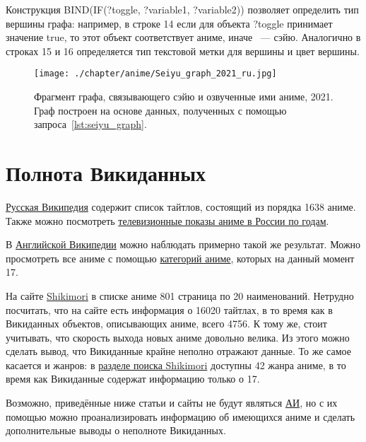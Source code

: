 Конструкция BIND(IF(?toggle, ?variable1, ?variable2)) позволяет определить тип вершины графа: например, в строке 14 если для объекта ?toggle принимает значение true, то этот объект соответствует аниме, иначе ~--- сэйю. Аналогично в строках 15 и 16 определяется тип текстовой метки для вершины и цвет вершины.

\newpage
\begin{fullwidth}
\begin{figure*}[h]
	\texttt{[image: ./chapter/anime/Seiyu\_graph\_2021\_ru.jpg]}
	\caption[Фрагмент графа, связывающего сэйю и озвученные ими аниме, 2021.]{Фрагмент графа, связывающего сэйю и озвученные ими аниме, 2021. Граф построен на основе данных, полученных с помощью запроса~\protect\ref{lst:seiyu_graph}.}%
      \label{fig:Seiyu_graph_2021_ru}%
\end{figure*} 
\end{fullwidth}

\section{Полнота Викиданных}

\href{https://clck.ru/YTPf9}{Русская Википедия} содержит список тайтлов, состоящий из порядка \num{1638} аниме. Также можно посмотреть \href{https://clck.ru/YTPgk}{телевизионные показы аниме в России по годам}.

В \href{https://en.wikipedia.org/wiki/Lists_of_anime}{Английской Википедии} можно наблюдать примерно такой же результат. Можно просмотреть все аниме с помощью \href{https://en.wikipedia.org/wiki/Category:Lists_of_anime_by_genre}{категорий аниме}, которых на данный момент \num{17}.

На сайте \href{https://shikimori.one/}{Shikimori} в списке аниме \num{801} страница по \num{20} наименований. Нетрудно посчитать, что на сайте есть информация о \num{16020} тайтлах, в то время как в Викиданных объектов, описывающих аниме, всего \num{4756}. К тому же, стоит учитывать, что скорость выхода новых аниме довольно велика. Из этого можно сделать вывод, что Викиданные крайне неполно отражают данные. То же самое касается и жанров: в \href{https://shikimori.one/animes}{разделе поиска Shikimori} доступны \num{42} жанра аниме, в то время как Викиданные содержат информацию только о \num{17}.

Возможно, приведённые ниже статьи и сайты не будут являться \href{https://clck.ru/FLzh8}{АИ}, но с их помощью можно проанализировать информацию об имеющихся аниме и сделать дополнительные выводы о неполноте Викиданных.

